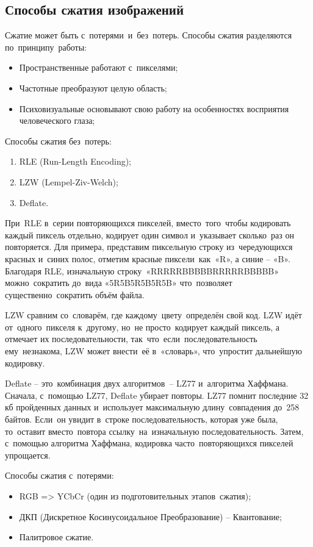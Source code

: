 \documentclass{ou}
\begin{document}
\subsection{Способы сжатия изображений}
Сжатие может быть с~потерями~и~без~потерь. Способы сжатия разделяются по~принципу~работы:
\begin{itemize}[label=-, itemindent=2em, nosep]
\item Пространственные работают с~пикселями;
\item Частотные преобразуют целую область;
\item Психовизуальные основывают свою работу на особенностях восприятия человеческого глаза;
\end{itemize}

Способы сжатия без~потерь:
\begin{enumerate}[itemindent=2em, nosep, label=\arabic*)]
\item RLE (Run-Length Encoding);
\item LZW (Lempel-Ziv-Welch);
\item Deflate.
\end{enumerate}

При~RLE в~серии повторяющихся пикселей, вместо~того~чтобы кодировать каждый пиксель отдельно, кодирует один символ и~указывает сколько~раз он повторяется. Для примера, представим пиксельную строку из~чередующихся красных и~синих полос, отметим красные пиксели~как~«R», а синие -- «B». Благодаря RLE, изначальную строку~«RRRRR\allowbreak BBBBB\allowbreak RRRRR\allowbreak BBBBB» можно~сократить до~вида «5R5B5R5B5R5B» что~позволяет существенно~сократить объём файла.

LZW сравним со~словарём, где каждому~цвету~определён свой код. LZW идёт от~одного~пикселя к~другому, но~не просто~кодирует каждый пиксель, а отмечает их последовательности, так~что~если~последовательность ему~незнакома, LZW может внести~её в~«словарь», что~упростит дальнейшую кодировку.

Deflate -- это~комбинация двух алгоритмов~-- LZ77 и~алгоритма Хаффмана. Сначала, с~помощью LZ77, Deflate убирает повторы. LZ77 помнит последние 32 кб пройденных данных и~использует максимальную длину~совпадения до~258 байтов. Если~он увидит в~строке последовательность, которая уже была, то~оставит вместо~повтора ссылку~на~изначальную последовательность. Затем, с~помощью алгоритма Хаффмана, кодировка часто~повторяющихся пикселей упрощается.

Способы сжатия с~потерями:
\begin{itemize}[label=-, itemindent=2em, nosep]
  \item RGB => YCbCr (один из подготовительных этапов~сжатия);
  \item ДКП (Дискретное Косинусоидальное Преобразование) – Квантование;
  \item Палитровое сжатие.
\end{itemize}
\end{document}
